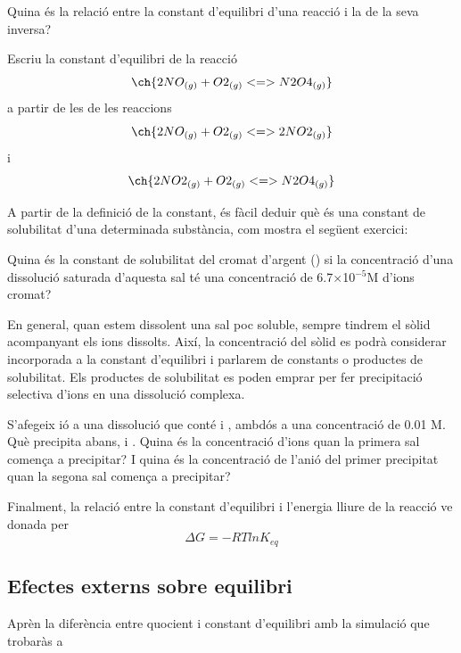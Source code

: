 \begin{exr}
Quina és la relació entre la constant d'equilibri d'una reacció i la de la seva inversa?
\end{exr}

\begin{exr}
Escriu la constant d'equilibri de la reacció 
\[\ch{2 NO_{(g)} + O2_{(g)} <=> N2O4_{(g)}}\]
a partir de les de les reaccions 
\[\ch{2 NO_{(g)} + O2_{(g)} <=> 2 NO2_{(g)}}\]
i 
\[\ch{2 NO2_{(g)} + O2_{(g)} <=> N2O4_{(g)}}\]
\end{exr}



A partir de la definició de la constant, és fàcil deduir què és una constant de solubilitat d'una determinada substància, com mostra el següent exercici:

\begin{exr}
Quina és la constant de solubilitat del cromat d'argent () si la concentració d'una dissolució saturada d'aquesta sal té una concentració de 6.7$\times$10$^{-5}$M d'ions cromat?
\end{exr}

En general, quan estem dissolent una sal poc soluble, sempre tindrem el sòlid acompanyant els ions dissolts. Així, la concentració del sòlid es podrà considerar incorporada a la constant d'equilibri i parlarem de constants o productes de solubilitat.
Els productes de solubilitat es poden emprar per fer precipitació selectiva d'ions en una dissolució complexa. 

\begin{exr}
S'afegeix ió  a una dissolució que conté  i , ambdós a una concentració de 0.01 M. Què precipita abans,  i . Quina és la concentració d'ions  quan la primera sal comença a precipitar? I quina és la concentració de l'anió del primer precipitat quan la segona sal comença a precipitar?
\end{exr}

Finalment, la relació entre la constant d'equilibri i l'energia lliure de la reacció ve donada per
\[\Delta G = -RT ln K_{eq}\]

\subsection{Efectes externs sobre equilibri}

\begin{tcolorbox}[colback=green!5,colframe=green!40!black,title=Constant d'Equilibri]
Aprèn la diferència entre quocient i constant d'equilibri amb la simulació que trobaràs a 
\end{tcolorbox}


